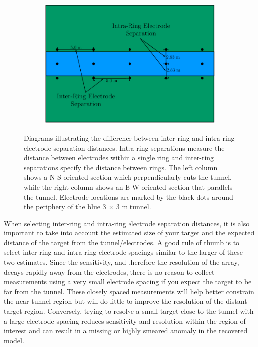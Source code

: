 \documentclass[preprint,authoryear,12pt]{elsarticle}
\begin{document}
\begin{figure}[htp]{}
\begin{center}
\begin{subfigure}{0.56\linewidth}
         \label{fig:ElectrodeSpacing_StraightTunnel_Layout_Ring_Y}
         \includegraphics[trim=0cm 0cm 0cm 0cm, clip=true,width=\linewidth]{./figures/Fig7b.pdf}
      \end{subfigure}
   \end{center}
\vspace{-0.4cm}
\caption{Diagrams illustrating the difference between inter-ring and intra-ring electrode separation distances. Intra-ring separations measure the distance between electrodes within a single ring and inter-ring separations specify the distance between rings. The left column shows a N-S oriented section which perpendicularly cuts the tunnel, while the right column shows an E-W oriented section that parallels the tunnel. Electrode locations are marked by the black dots around the periphery of the blue 3 $\times$ 3 m tunnel.}
\label{fig:ElectrodeSpacing_StraightTunnel_Layout}
\end{figure}

When selecting inter-ring and intra-ring electrode separation distances, it is also important to take into account the estimated size of your target and the expected distance of the target from the tunnel/electrodes. A good rule of thumb is to select inter-ring and intra-ring electrode spacings similar to the larger of these two estimates. Since the sensitivity, and therefore the resolution of the array, decays rapidly away from the electrodes, there is no reason to collect measurements using a very small electrode spacing if you expect the target to be far from the tunnel. These closely spaced measurements will help better constrain the near-tunnel region but will do little to improve the resolution of the distant target region. Conversely, trying to resolve a small target close to the tunnel with a large electrode spacing reduces sensitivity and resolution within the region of interest and can result in a missing or highly smeared anomaly in the recovered model.
\end{document}
